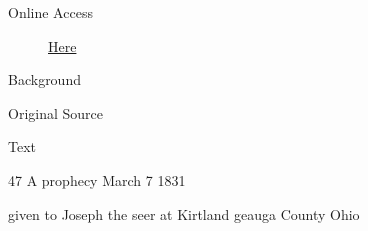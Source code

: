 			\begin{description}
				\item[Online Access] \href{https://www.josephsmithpapers.org/paper-summary/revelation-circa-7-march-1831-dc-45/1}{Here}
			\end{description}
			
			\begin{description}
				\item[Background]
			\end{description}
			
			
			\begin{description}
				\item[Original Source]
			\end{description}
			
			
			\begin{description}
				\item[Text]
			\end{description}
			
				\begin{tightcenter}
				47 A prophecy March 7 1831
				\end{tightcenter}
				
				given to Joseph the seer at Kirtland geauga County Ohio
				
